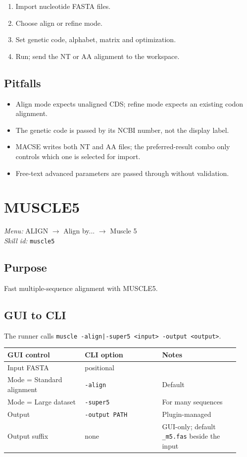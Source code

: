 \documentclass[11pt]{report}
\begin{document}
\begin{enumerate}
  \item Import nucleotide FASTA files.
  \item Choose align or refine mode.
  \item Set genetic code, alphabet, matrix and optimization.
  \item Run; send the NT or AA alignment to the workspace.
\end{enumerate}

\subsection{Pitfalls}

\begin{itemize}
  \item Align mode expects unaligned CDS; refine mode expects an existing codon alignment.
  \item The genetic code is passed by its NCBI number, not the display label.
  \item MACSE writes both NT and AA files; the preferred-result combo only controls which one is selected for import.
  \item Free-text advanced parameters are passed through without validation.
\end{itemize}


\section{MUSCLE5}
\noindent\textit{Menu:} ALIGN $\rightarrow$ Align by... $\rightarrow$ Muscle 5\\
\noindent\textit{Skill id:} \texttt{muscle5}

\subsection{Purpose}

Fast multiple-sequence alignment with MUSCLE5.

\subsection{GUI to CLI}

The runner calls \texttt{muscle -align|\allowbreak -super5 <input> -output <output>}.

{\footnotesize
\begin{longtable}{@{}>{\raggedright\arraybackslash}p{0.31\linewidth}>{\raggedright\arraybackslash}p{0.31\linewidth}>{\raggedright\arraybackslash}p{0.31\linewidth}@{}}
\toprule
GUI control & CLI option & Notes \\
\midrule
\endhead
Input FASTA & positional &  \\
Mode = Standard alignment & \texttt{-align} & Default \\
Mode = Large dataset & \texttt{-super5} & For many sequences \\
Output & \texttt{-output PATH} & Plugin-managed \\
Output suffix & none & GUI-only; default \texttt{\_\allowbreak m5.\allowbreak fas} beside the input \\
\bottomrule
\end{longtable}
}
\end{document}
